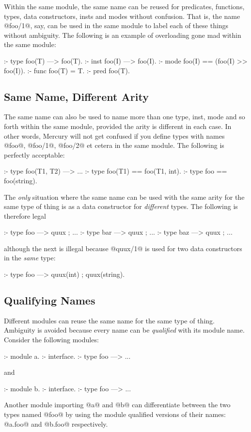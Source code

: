 Within the same module, the same name can be reused for predicates,
functions, types, data constructors, insts and modes without confusion.
That is, the name @foo/1@, say, can be used in the same module to label
each of these things without ambiguity.  The following is an example of
overloading gone mad within the same module:
\begin{myverbatim}
:- type foo(T) ---> foo(T).
:- inst foo(I) ---> foo(I).
:- mode foo(I) ==   (foo(I) >> foo(I)).
:- func foo(T) =    T.
:- pred foo(T).
\end{myverbatim}

\subsection{Same Name, Different Arity}

The same name can also be used to name more than one type, inst, mode
and so forth within the same module, provided the arity is different in
each case.  In other words, Mercury will not get confused if you define
types with names @foo@, @foo/1@, @foo/2@ et cetera in the same module.
The following is perfectly acceptable:
\begin{myverbatim}
:- type foo(T1, T2) ---> ...
:- type foo(T1)     ==   foo(T1, int).
:- type foo         ==   foo(string).
\end{myverbatim}
The \emph{only} situation where the same name can be used with the same
arity for the same type of thing is as a data constructor for
\emph{different} types.  The following is therefore legal
\begin{myverbatim}
:- type foo ---> quux ; ...
:- type bar ---> quux ; ...
:- type baz ---> quux ; ...
\end{myverbatim}
although the next is illegal because @quux/1@ is used for two data
constructors in the \emph{same} type:
\begin{myverbatim}
:- type foo ---> quux(int) ; quux(string).
\end{myverbatim}

\subsection{Qualifying Names}

Different modules can reuse the same name for the same type of thing.
Ambiguity is avoided because every name can be \emph{qualified} with its
module name.  Consider the following modules:
\begin{myverbatim}
:- module a.
:- interface.
:- type foo ---> ...
\end{myverbatim}
and
\begin{myverbatim}
:- module b.
:- interface.
:- type foo ---> ...
\end{myverbatim}
Another module importing @a@ and @b@ can differentiate between the two
types named @foo@ by using the module qualified versions of their names:
@a.foo@ and @b.foo@ respectively.

